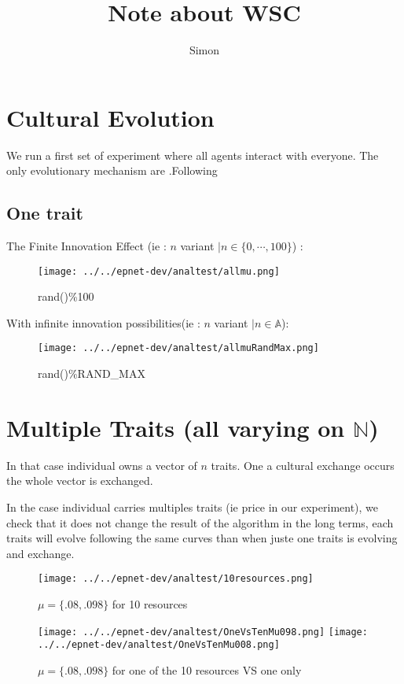 \documentclass[a4paper]{article}
\title{Note about WSC}
\author{Simon}
\begin{document}
\maketitle
\section{Cultural Evolution}


We run a first set of experiment where all agents interact with everyone. The only evolutionary mechanism are .Following \cite{bentley2004randomdriftandculturechange}

\subsection{One trait}

The Finite Innovation Effect (ie : $n$ variant  $| n\in\{0,\cdots,100\}$) :
\begin{figure}[h]
	\begin{center}
		\texttt{[image: ../../epnet-dev/analtest/allmu.png]}
	\end{center}
	\caption{rand()\%100}
	\label{fig:finitEffect}
\end{figure}


With infinite innovation possibilities(ie : $n$ variant $| n\in\mathbb{A} $):
\begin{figure}[hbp]
	\begin{center}
		\texttt{[image: ../../epnet-dev/analtest/allmuRandMax.png]}
	\end{center}
	\caption{rand()\%RAND\_MAX}
	\label{fig:allMutation}
\end{figure}


\section{Multiple Traits (all varying on $\mathbb{N}$)}
In that case individual owns a vector of $n$ traits. One a cultural exchange occurs the whole vector is exchanged.

In the case individual carries multiples traits (ie price in our experiment), we check that it does not change the result of the algorithm in the long terms, each traits will evolve following the same curves than when juste one traits is evolving and exchange.
\begin{figure}[h]
	\begin{center}
		\texttt{[image: ../../epnet-dev/analtest/10resources.png]}
	\end{center}
	\caption{$\mu=\{.08,.098\}$ for 10 resources}
	\label{fig:10resources}
\end{figure}

\begin{figure}[h]
	\begin{center}
		\texttt{[image: ../../epnet-dev/analtest/OneVsTenMu098.png]}
		\texttt{[image: ../../epnet-dev/analtest/OneVsTenMu008.png]}
	\end{center}
	\caption{$\mu=\{.08,.098\}$ for one of the 10 resources VS one only}
	\label{fig:OneVsTen}
\end{figure}


  
\end{document}
